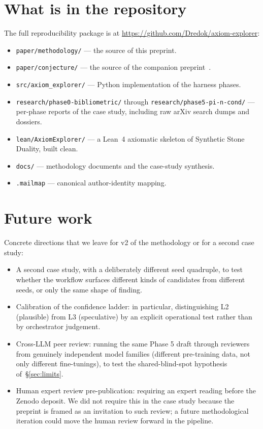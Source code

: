 \documentclass[11pt]{article}
\theoremstyle{definition}
\theoremstyle{remark}
\begin{document}
\section{What is in the repository}\label{sec:repo}

The full reproducibility package is at
\url{https://github.com/Dredok/axiom-explorer}:

\begin{itemize}
\item \texttt{paper/methodology/} --- the source of this preprint.
\item \texttt{paper/conjecture/} --- the source of the companion
preprint~\cite{Vera2026Conjecture}.
\item \texttt{src/axiom\_explorer/} --- Python implementation of the
harness phases.
\item \texttt{research/phase0-bibliometric/} through
\texttt{research/phase5-pi-n-cond/} --- per-phase reports of the
case study, including raw arXiv search dumps and dossiers.
\item \texttt{lean/AxiomExplorer/} --- a Lean~4 axiomatic skeleton of
Synthetic Stone Duality, built clean.
\item \texttt{docs/} --- methodology documents and the
case-study synthesis.
\item \texttt{.mailmap} --- canonical author-identity mapping.
\end{itemize}

\section{Future work}\label{sec:future}

Concrete directions that we leave for v2 of the methodology or for a
second case study:

\begin{itemize}
\item A second case study, with a deliberately different seed
quadruple, to test whether the workflow surfaces different kinds of
candidates from different seeds, or only the same shape of finding.
\item Calibration of the confidence ladder: in particular,
distinguishing L2 (plausible) from L3 (speculative) by an explicit
operational test rather than by orchestrator judgement.
\item Cross-LLM peer review: running the same Phase 5 draft through
reviewers from genuinely independent model families (different
pre-training data, not only different fine-tunings), to test the
shared-blind-spot hypothesis of~\S\ref{sec:limits}.
\item Human expert review pre-publication: requiring an expert reading
before the Zenodo deposit. We did not require this in the case study
because the preprint is framed as an invitation to such review; a
future methodological iteration could move the human review forward in
the pipeline.
\end{itemize}
\end{document}
